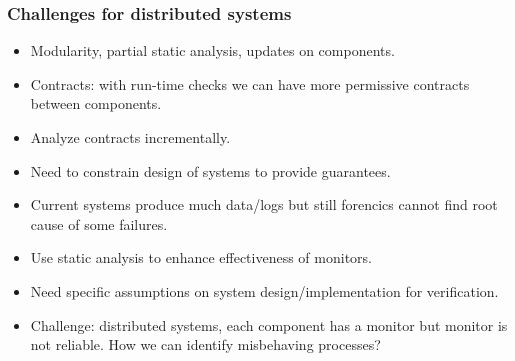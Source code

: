 \documentclass{beamer}
\begin{document}
\begin{frame}
  \frametitle{Challenges for distributed systems}

\begin{itemize}

\item Modularity, partial static analysis, updates on components.

\item Contracts: with run-time checks we can have more permissive contracts
  between components.

\item Analyze contracts incrementally.

\item Need to constrain design of systems to provide guarantees.

\item Current systems produce much data/logs but still forencics cannot find
  root cause of some failures.

\item Use static analysis to enhance effectiveness of monitors.

\item Need specific assumptions on system design/implementation for verification.

\item Challenge: distributed systems, each component has a monitor but monitor
  is not reliable. How we can identify misbehaving processes?

\end{itemize}

\end{frame}
\end{document}
